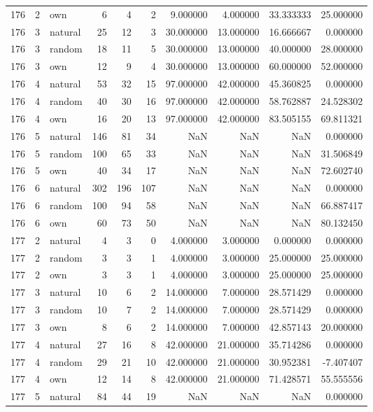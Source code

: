 \begin{table}[htbp]
\begin{tabular}{rrlrrrrrrr}
176 & 2 & own & 6 & 4 & 2 & 9.000000 & 4.000000 & 33.333333 & 25.000000 \\
176 & 3 & natural & 25 & 12 & 3 & 30.000000 & 13.000000 & 16.666667 & 0.000000 \\
176 & 3 & random & 18 & 11 & 5 & 30.000000 & 13.000000 & 40.000000 & 28.000000 \\
176 & 3 & own & 12 & 9 & 4 & 30.000000 & 13.000000 & 60.000000 & 52.000000 \\
176 & 4 & natural & 53 & 32 & 15 & 97.000000 & 42.000000 & 45.360825 & 0.000000 \\
176 & 4 & random & 40 & 30 & 16 & 97.000000 & 42.000000 & 58.762887 & 24.528302 \\
176 & 4 & own & 16 & 20 & 13 & 97.000000 & 42.000000 & 83.505155 & 69.811321 \\
176 & 5 & natural & 146 & 81 & 34 & NaN & NaN & NaN & 0.000000 \\
176 & 5 & random & 100 & 65 & 33 & NaN & NaN & NaN & 31.506849 \\
176 & 5 & own & 40 & 34 & 17 & NaN & NaN & NaN & 72.602740 \\
176 & 6 & natural & 302 & 196 & 107 & NaN & NaN & NaN & 0.000000 \\
176 & 6 & random & 100 & 94 & 58 & NaN & NaN & NaN & 66.887417 \\
176 & 6 & own & 60 & 73 & 50 & NaN & NaN & NaN & 80.132450 \\
177 & 2 & natural & 4 & 3 & 0 & 4.000000 & 3.000000 & 0.000000 & 0.000000 \\
177 & 2 & random & 3 & 3 & 1 & 4.000000 & 3.000000 & 25.000000 & 25.000000 \\
177 & 2 & own & 3 & 3 & 1 & 4.000000 & 3.000000 & 25.000000 & 25.000000 \\
177 & 3 & natural & 10 & 6 & 2 & 14.000000 & 7.000000 & 28.571429 & 0.000000 \\
177 & 3 & random & 10 & 7 & 2 & 14.000000 & 7.000000 & 28.571429 & 0.000000 \\
177 & 3 & own & 8 & 6 & 2 & 14.000000 & 7.000000 & 42.857143 & 20.000000 \\
177 & 4 & natural & 27 & 16 & 8 & 42.000000 & 21.000000 & 35.714286 & 0.000000 \\
177 & 4 & random & 29 & 21 & 10 & 42.000000 & 21.000000 & 30.952381 & -7.407407 \\
177 & 4 & own & 12 & 14 & 8 & 42.000000 & 21.000000 & 71.428571 & 55.555556 \\
177 & 5 & natural & 84 & 44 & 19 & NaN & NaN & NaN & 0.000000 \\

\end{tabular}
\end{table}
